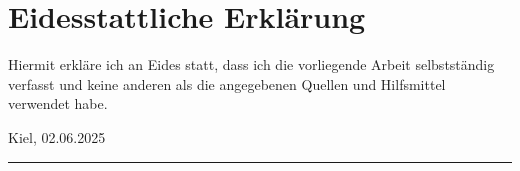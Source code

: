 
\chapter*{\Large Eidesstattliche Erklärung}

\vspace{0.5cm}

\noindent Hiermit erkläre ich an Eides statt, dass ich die vorliegende Arbeit selbstständig verfasst und keine anderen als die angegebenen Quellen und Hilfsmittel verwendet habe.

\bigskip\noindent Kiel, 02.06.2025
\vskip 10mm
\hfill\rule{18em}{.3pt}%
\vfill
